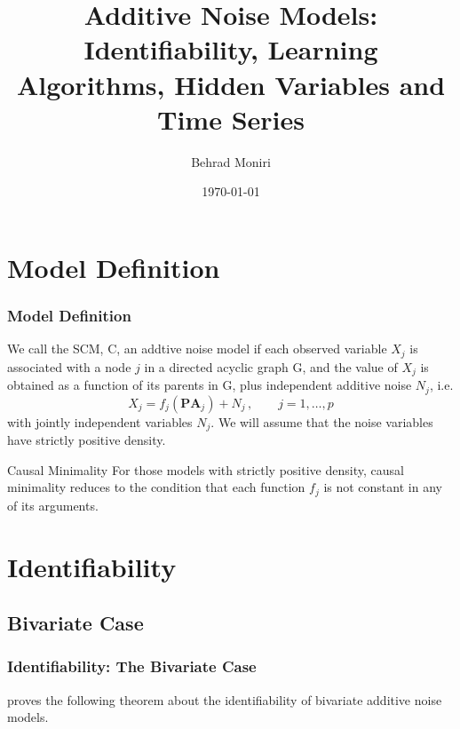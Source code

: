 \documentclass{beamer}
\title[Additive Noise Models]{Additive Noise Models: Identifiability, Learning Algorithms, Hidden Variables and Time Series}
\author{Behrad Moniri}
\institute[EE @ Sharif] 
{
Sharif University of Technology \\
\medskip
\textit{bemoniri@ee.sharif.edu}
}
\date{\today}
\newcommand{\B}[1]{\mathbf{#1}}
\newcommand{\PA}[2][]{{\B{PA}}^{#1}_{#2}}
\begin{document}
\begin{frame}
\titlepage
\end{frame}
\section{Model Definition}
\begin{frame}
\frametitle{Model Definition}
We call the SCM, C, an addtive noise model if each observed variable
$X_j$ is associated with a node $j$ in a directed acyclic graph G, and the value of
$X_j$ is obtained as a function of its parents in G, plus independent additive noise
$N_j$, i.e.
\begin{equation} \label{eq:anm}
X_j = f_j(\PA{j}) + N_j\,, \qquad j=1, \ldots, p
\end{equation}
with jointly independent variables $N_j$. We will assume that the noise variables have strictly positive density.

\begin{alertblock}{Causal Minimality}
For those models with strictly positive density, causal minimality reduces to the condition that each function $f_j$ is not constant in any of its arguments.
\end{alertblock}
\end{frame}


\section{Identifiability}
\subsection{Bivariate Case}

\begin{frame}
\frametitle{Identifiability: The Bivariate Case}
 \cite{hoyer} proves the following theorem about the identifiability of  bivariate additive noise models.
\end{frame}
\end{document}
